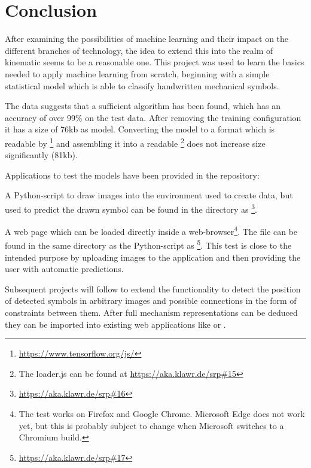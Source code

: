 \section{Conclusion}

After examining the possibilities of machine learning and their impact on the different branches of technology, the idea to extend this into the realm of kinematic seems to be a reasonable one.
This project was used to learn the basics needed to apply machine learning from scratch, beginning with a simple statistical model which is able to classify handwritten mechanical symbols.

The data suggests that a sufficient algorithm has been found, which has an accuracy of over 99\% on the test data.
After removing the training configuration it has a size of 76kb as  model.
Converting the model to a format which is readable by \footnote{\url{https://www.tensorflow.org/js/}} and assembling it into a readable \footnote{The loader.js can be found at \url{https://aka.klawr.de/srp\#15}} does not increase size significantly (81kb).

Applications to test the models have been provided in the repository:

A Python-script to draw images into the environment used to create data, but used to predict the drawn symbol can be found in the  directory as \footnote{\url{https://aka.klawr.de/srp\#16}}.

A web page which can be loaded directly inside a web-browser\footnote{The test works on Firefox and Google Chrome. Microsoft Edge does not work yet, but this is probably subject to change when Microsoft switches to a Chromium build. }.
The file can be found in the same directory as the Python-script as \footnote{\url{https://aka.klawr.de/srp\#17}}.
This test is close to the intended purpose by uploading images to the application and then providing the user with automatic predictions.

Subsequent projects will follow to extend the functionality to detect the position of detected symbols in arbitrary images and possible connections in the form of constraints between them.
After full mechanism representations can be deduced they can be imported into existing web applications like  \cite{Goessner2019} \cite{Goessner2019a} \cite{Goessner2019b} or  \cite{Uhlig2019} \cite{Uhlig2019a}.
